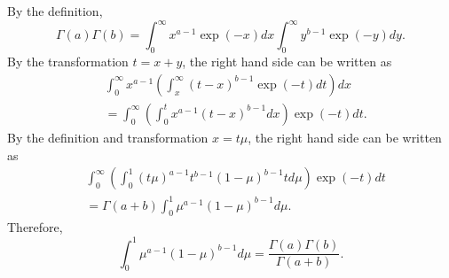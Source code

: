 \subsection{}
\label{2.5}
By the definition,
%
\begin{equation}
\Gamma (a) \Gamma (b) = \int_{0}^{\infty} x ^ {a - 1} \exp (- x) dx \int_{0}^{\infty} y ^ {b - 1} \exp (- y) dy.
\end{equation}
%
By the transformation $t = x + y$, the right hand side can be written as
%
\begin{equation}
\begin{aligned}
&\int_{0}^{\infty} x ^ {a - 1} \left( \int_{x}^{\infty} (t - x) ^ {b - 1} \exp (- t) dt \right) dx \\
&=  \int_{0}^{\infty} \left( \int_{0}^{t} x ^ {a - 1} (t - x) ^ {b - 1} dx \right) \exp (- t) dt.
\end{aligned}
\end{equation}
%
By the definition and transformation $x = t \mu$, the right hand side can be written as
%
\begin{equation}
\begin{aligned}
&\int_{0}^{\infty} \left( \int_{0}^{1} (t \mu) ^ {a - 1} t ^ {b - 1} (1 - \mu) ^ {b - 1} t d\mu \right) \exp (- t) dt \\
&= \Gamma (a + b) \int_{0}^{1} \mu ^ {a - 1} (1 - \mu) ^ {b - 1} d\mu.
\end{aligned}
\end{equation}
%
Therefore,
%
\begin{equation}
\int_{0}^{1} \mu ^ {a - 1} (1 - \mu) ^ {b - 1} d\mu = \frac{\Gamma (a) \Gamma (b)}{\Gamma (a + b)}.
\end{equation}
%
















